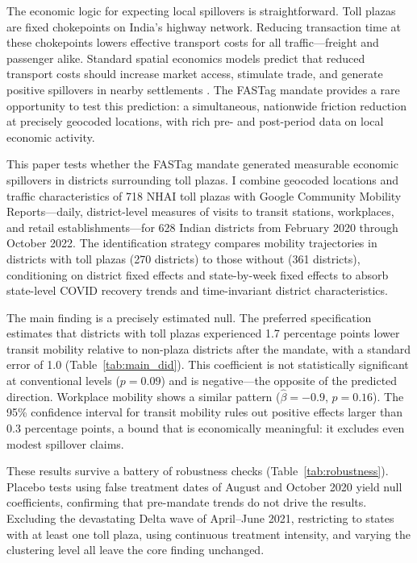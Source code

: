 \documentclass[12pt]{article}
\begin{document}
The economic logic for expecting local spillovers is straightforward. Toll plazas are fixed chokepoints on India's highway network. Reducing transaction time at these chokepoints lowers effective transport costs for all traffic---freight and passenger alike. Standard spatial economics models predict that reduced transport costs should increase market access, stimulate trade, and generate positive spillovers in nearby settlements \citep{donaldson2018railroads, faber2014trade}. The FASTag mandate provides a rare opportunity to test this prediction: a simultaneous, nationwide friction reduction at precisely geocoded locations, with rich pre- and post-period data on local economic activity.

This paper tests whether the FASTag mandate generated measurable economic spillovers in districts surrounding toll plazas. I combine geocoded locations and traffic characteristics of 718 NHAI toll plazas with Google Community Mobility Reports---daily, district-level measures of visits to transit stations, workplaces, and retail establishments---for 628 Indian districts from February 2020 through October 2022. The identification strategy compares mobility trajectories in districts with toll plazas (270 districts) to those without (361 districts), conditioning on district fixed effects and state-by-week fixed effects to absorb state-level COVID recovery trends and time-invariant district characteristics.

The main finding is a precisely estimated null. The preferred specification estimates that districts with toll plazas experienced 1.7 percentage points lower transit mobility relative to non-plaza districts after the mandate, with a standard error of 1.0 (Table~\ref{tab:main_did}). This coefficient is not statistically significant at conventional levels ($p = 0.09$) and is negative---the opposite of the predicted direction. Workplace mobility shows a similar pattern ($\hat{\beta} = -0.9$, $p = 0.16$). The 95\% confidence interval for transit mobility rules out positive effects larger than 0.3 percentage points, a bound that is economically meaningful: it excludes even modest spillover claims.

These results survive a battery of robustness checks (Table~\ref{tab:robustness}). Placebo tests using false treatment dates of August and October 2020 yield null coefficients, confirming that pre-mandate trends do not drive the results. Excluding the devastating Delta wave of April--June 2021, restricting to states with at least one toll plaza, using continuous treatment intensity, and varying the clustering level all leave the core finding unchanged.
\end{document}
